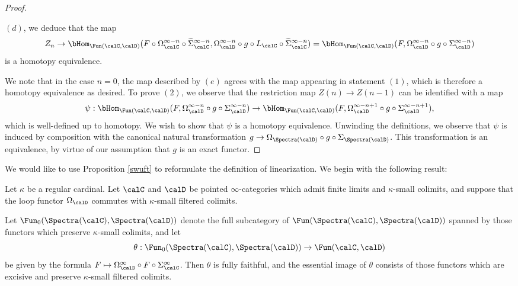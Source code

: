 \begin{proof}
\begin{itemize}
$(d)$, we deduce that the map
$$ Z_{n} \rightarrow \bHom_{ \Fun(\calC, \calD)}( F \circ \Omega^{\infty-n}_{\calC}
\circ \widetilde{\Sigma}^{\infty-n}_{\calC},
\Omega^{\infty-n}_{\calD} \circ g \circ L_{\calC} \circ \widetilde{\Sigma}^{\infty-n}_{\calC})
= \bHom_{ \Fun(\calC, \calD)}( F, \Omega^{\infty-n}_{\calD} \circ g \circ \Sigma^{\infty-n}_{\calD})$$
is a homotopy equivalence.
\end{itemize}
We note that in the case $n=0$, the map described by $(e)$ agrees with the map appearing
in statement $(1)$, which is therefore a homotopy equivalence as desired. To prove $(2)$,
we observe that the restriction map $Z(n) \rightarrow Z(n-1)$ can be identified with a map
$$ \psi: \bHom_{ \Fun(\calC, \calD)}( F, \Omega^{\infty-n}_{\calD} \circ g \circ \Sigma^{\infty-n}_{\calD})
\rightarrow \bHom_{ \Fun(\calC, \calD)}( F, \Omega^{\infty-n+1}_{\calD} \circ g \circ \Sigma^{\infty-n+1}_{\calD}),$$
which is well-defined up to homotopy. We wish to show that $\psi$ is a homotopy equivalence.
Unwinding the definitions, we observe that $\psi$ is induced by composition with the canonical natural transformation $g \rightarrow \Omega_{ \Spectra(\calD)} \circ g \circ \Sigma_{ \Spectra(\calD) }$.
This transformation is an equivalence, by virtue of our assumption that $g$ is an exact functor.
\end{proof}

We would like to use Proposition \ref{swuft} to reformulate the definition of linearization.
We begin with the following result:

\begin{proposition}\label{urbusk}
Let $\kappa$ be a regular cardinal. Let $\calC$ and $\calD$ be pointed $\infty$-categories
which admit finite limits and $\kappa$-small colimits, and suppose that the loop functor
$\Omega_{\calD}$ commutes with $\kappa$-small filtered colimits.

Let $\Fun_0(\Spectra(\calC), \Spectra(\calD) )$ denote the full
subcategory of $\Fun( \Spectra(\calC), \Spectra(\calD) )$ spanned by those functors which preserve $\kappa$-small colimits, and let 
$$ \theta: \Fun_0( \Spectra(\calC), \Spectra(\calD) ) \rightarrow \Fun(\calC, \calD)$$
be given by the formula $F \mapsto \Omega_{\calD}^{\infty} \circ F \circ \Sigma^{\infty}_{\calC}$.
Then $\theta$ is fully faithful, and the essential image of $\theta$ consists of those functors
which are excisive and preserve $\kappa$-small filtered colimits.
\end{proposition}


